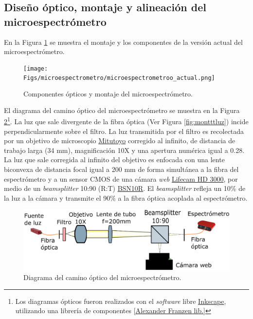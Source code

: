 \singlespacing
\subsection{Diseño óptico, montaje y alineación del microespectrómetro}
\label{sec:montalin}

\hspace{0.5cm}En la Figura \ref{fig:micromfinal} se muestra el montaje y los componentes de la versión actual del microespectrómetro. 
\begin{figure}[H]
	\centering
	\texttt{[image: Figs/microespectrometro/microespectrometroo\_actual.png]}
	\caption{Componentes ópticos y montaje del microespectrómetro.}
	\label{fig:micromfinal}
\end{figure}
El diagrama del camino óptico del microespectrómetro se muestra en la Figura \ref{fig:diagcaminoopt}\footnote{Los diagramas ópticos fueron realizados con el \textit{software} libre \href{https://inkscape.org/es/}{Inkscape}, utilizando una librería de componentes [\href{http://www.gwoptics.org/ComponentLibrary/}{Alexander Franzen lib.]}}. La luz que sale divergente de la fibra óptica (Ver Figura \ref{fig:montttluz}) incide perpendicularmente sobre el filtro. La luz transmitida por el filtro es recolectada por un objetivo de microscopio \href{https://www.edmundoptics.com/p/10x-mitutoyo-plan-apo-infinity-corrected-long-wd-objective/6623/}{Mitutoyo} corregido al infinito, de distancia de trabajo larga (34 mm), magnificación 10X y una apertura numérica igual a 0.28. La luz que sale corregida al infinito del objetivo es enfocada con una lente biconvexa de distancia focal igual a 200 mm de forma simultánea a la fibra del espectrómetro y a un sensor CMOS de una cámara \textit{web} \href{https://www.microsoft.com/accessories/es-xl/d/lifecam-hd-3000}{Lifecam HD 3000}, por medio de un \textit{beamsplitter} 10:90 (R:T) \href{https://www.thorlabs.com/thorproduct.cfm?partnumber=BSN10R}{BSN10R}. El \textit{beamsplitter} refleja un 10\% de la luz a la cámara y transmite el 90\% a la fibra óptica acoplada al espectrómetro. 
\begin{figure}[H]
	\centering
	\includegraphics[width=1.0\textwidth]{Figs/microespectrometro/diagopticosetup.png}
	\caption{Diagrama del camino óptico del microespectrómetro.}
	\label{fig:diagcaminoopt}
\end{figure}

